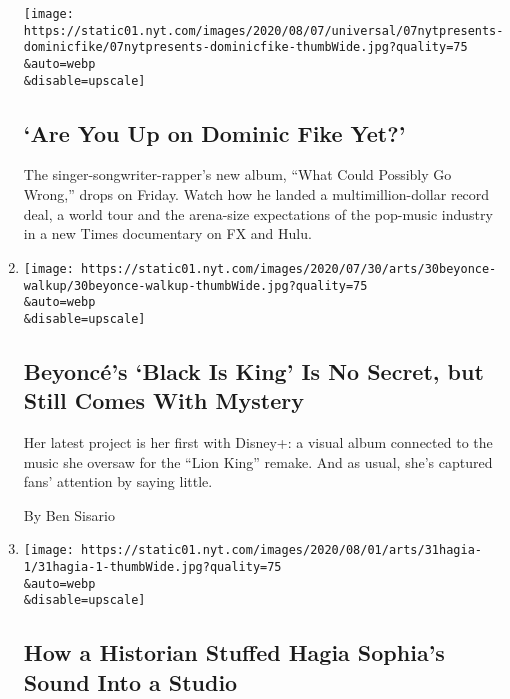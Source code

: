 \begin{enumerate}
  \texttt{[image: https://static01.nyt.com/images/2020/08/07/universal/07nytpresents-dominicfike/07nytpresents-dominicfike-thumbWide.jpg?quality=75\\\&auto=webp\\\&disable=upscale]}

  \hypertarget{are-you-up-on-dominic-fike-yet}{%
  \subsection{`Are You Up on Dominic Fike
  Yet?'}\label{are-you-up-on-dominic-fike-yet}}

  The singer-songwriter-rapper's new album, ``What Could Possibly Go
  Wrong,'' drops on Friday. Watch how he landed a multimillion-dollar
  record deal, a world tour and the arena-size expectations of the
  pop-music industry in a new Times documentary on FX and Hulu.
\item
  \href{/2020/07/30/arts/music/beyonce-black-is-king.html}{}

  \texttt{[image: https://static01.nyt.com/images/2020/07/30/arts/30beyonce-walkup/30beyonce-walkup-thumbWide.jpg?quality=75\\\&auto=webp\\\&disable=upscale]}

  \hypertarget{beyoncuxe9s-black-is-king-is-no-secret-but-still-comes-with-mystery}{%
  \subsection{Beyoncé's `Black Is King' Is No Secret, but Still Comes
  With
  Mystery}\label{beyoncuxe9s-black-is-king-is-no-secret-but-still-comes-with-mystery}}

  Her latest project is her first with Disney+: a visual album connected
  to the music she oversaw for the ``Lion King'' remake. And as usual,
  she's captured fans' attention by saying little.

  By Ben Sisario
\item
  \href{/2020/07/30/arts/music/hagia-sophia-acoustics-music.html}{}

  \texttt{[image: https://static01.nyt.com/images/2020/08/01/arts/31hagia-1/31hagia-1-thumbWide.jpg?quality=75\\\&auto=webp\\\&disable=upscale]}

  \hypertarget{how-a-historian-stuffed-hagia-sophias-sound-into-a-studio}{%
  \subsection{How a Historian Stuffed Hagia Sophia's Sound Into a
  Studio}\label{how-a-historian-stuffed-hagia-sophias-sound-into-a-studio}}


\end{enumerate}
